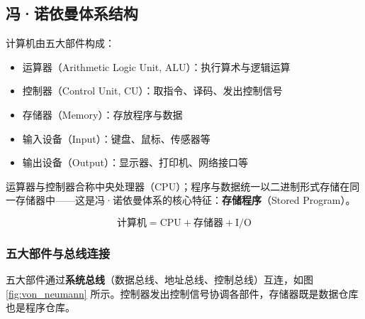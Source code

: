 \subsection{冯·诺依曼体系结构}

\begin{definition}[冯·诺依曼体系结构]
计算机由五大部件构成：
\begin{itemize}
    \item 运算器（Arithmetic Logic Unit, ALU）：执行算术与逻辑运算
    \item 控制器（Control Unit, CU）：取指令、译码、发出控制信号
    \item 存储器（Memory）：存放程序与数据
    \item 输入设备（Input）：键盘、鼠标、传感器等
    \item 输出设备（Output）：显示器、打印机、网络接口等
\end{itemize}
运算器与控制器合称中央处理器（CPU）；程序与数据统一以二进制形式存储在同一存储器中——这是冯·诺依曼体系的核心特征：\textbf{存储程序}（Stored Program）。
\end{definition}

\begin{equation}
\text{计算机} = \text{CPU} + \text{存储器} + \text{I/O}
\end{equation}

\subsubsection{五大部件与总线连接}

五大部件通过\textbf{系统总线}（数据总线、地址总线、控制总线）互连，如图 \ref{fig:von_neumann} 所示。控制器发出控制信号协调各部件，存储器既是数据仓库也是程序仓库。

